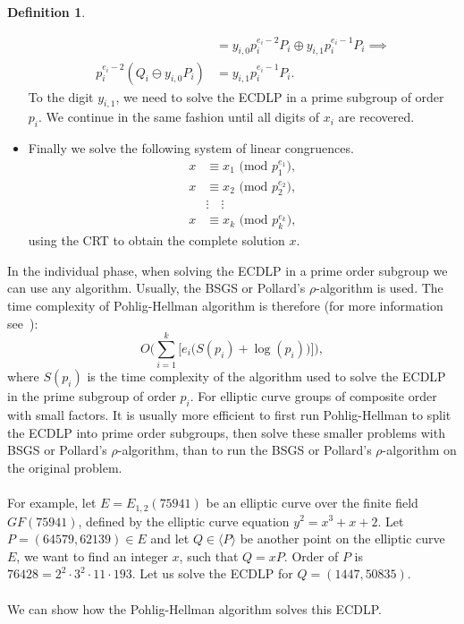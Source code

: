 \documentclass[thesis=M,english]{FITthesis}[2012/10/20]
\theoremstyle{remark}
\theoremstyle{definition}
\newtheorem{DF}{Definition}[section]
\begin{document}
\begin{DF}
\begin{itemize}
\begin{align*}
&= y_{i,0}p_i^{e_i-2}P_i \oplus y_{i,1}p_i^{e_i-1}P_i \implies \\
p_i^{e_i-2}(Q_i \ominus y_{i,0}P_i) &= y_{i,1}p_i^{e_i-1}P_i.
\end{align*}
To the digit $y_{i,1}$, we need to solve the ECDLP in a prime subgroup of order $p_i$. We continue in the same fashion until all digits of $x_i$ are recovered.
\item Finally we solve the following system of linear congruences.
\begin{align*}
x &\equiv x_1 \text{ (mod $p_1^{e_1}$)}, \\
x &\equiv x_2 \text{ (mod $p_2^{e_2}$)}, \\
&\vdots \quad \vdots \\
x &\equiv x_k \text{ (mod $p_k^{e_k}$)},
\end{align*}
using the CRT to obtain the complete solution $x$.
\end{itemize}
\end{DF}
\noindent In the individual phase, when solving the ECDLP in a prime order subgroup we can use any algorithm. Usually, the BSGS or Pollard's $\rho$-algorithm is used. The time complexity of Pohlig-Hellman algorithm is therefore (for more information see~\cite{mky}):
$$
O\bigg(\sum_{i=1}^k\bigg[e_i\big(S(p_i) + \log(p_i)\big)\bigg]\bigg),
$$ where $S(p_i)$ is the time complexity of the algorithm used to solve the ECDLP in the prime subgroup of order $p_i$. For elliptic curve groups of composite order with small factors. It is usually more efficient to first run Pohlig-Hellman to split the ECDLP into prime order subgroups, then solve these smaller problems with BSGS or Pollard's $\rho$-algorithm, than to run the BSGS or Pollard's $\rho$-algorithm on the original problem. \\\\
\noindent For example, let $E = E_{1,2}(75941)$ be an elliptic curve over the finite field $GF(75941)$, defined by the elliptic curve equation $y^2 = x^3 + x + 2$. Let $P = (64579,62139) \in E$ and let $Q \in \langle P \rangle$ be another point on the elliptic curve $E$, we want to find an integer $x$, such that $Q = xP.$ Order of $P$ is $76428 = 2^2\cdot 3^2\cdot 11 \cdot 193$. Let us solve the ECDLP for $Q = (1447, 50835)$. \\ \\
\noindent We can show how the Pohlig-Hellman algorithm solves this ECDLP. 
\end{document}
